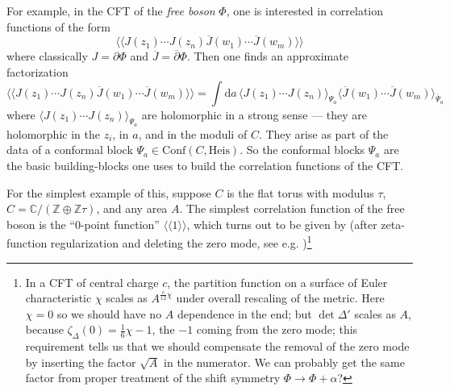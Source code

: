 \documentclass[12pt,letterpaper,reqno]{amsart}
\numberwithin{equation}{section}
\newcommand{\Heis}{{\mathrm{Heis}}}
\newcommand{\bbC}{\ensuremath{\mathbb C}}
\newcommand{\bbZ}{\ensuremath{\mathbb Z}}
\newcommand{\bJ}{\ensuremath{\overline J}}
\newcommand{\de}{\mathrm{d}}
\newcommand{\IP}[1]{\langle#1\rangle}
\newcommand{\DIP}[1]{\langle\!\langle#1\rangle\!\rangle}
\newcommand{\Conf}{\textrm{Conf}}
\newcommand{\ti}[1]{\textit{#1}}
\begin{document}
For example, in the CFT of the \ti{free boson} $\Phi$,
one is interested in correlation functions of the form
\begin{equation}
  \DIP{J(z_1) \cdots J(z_n) \bJ(w_1) \cdots \bJ(w_m)} 
\end{equation}
where classically $J = \partial \Phi$ and $\bJ = \overline\partial \Phi$.
Then one finds an approximate factorization
\begin{equation}
  \DIP{J(z_1) \cdots J(z_n) \bJ(w_1) \cdots \bJ(w_m)} = \int \de a \, \IP{J(z_1) \cdots J(z_n)}_{\Psi_a} \IP{\bJ(w_1) \cdots \bJ(w_m)}_{\overline\Psi_a}
\end{equation}
where $\IP{J(z_1) \cdots J(z_n)}_{\Psi_a}$ are holomorphic in a strong sense --- they
are holomorphic in the $z_i$, in $a$, and in the moduli of $C$.
They arise as part of the data of a conformal block $\Psi_a \in \Conf(C, \Heis)$.
So the conformal blocks $\Psi_a$ are the basic building-blocks one uses to build the 
correlation functions of the CFT.

For the simplest example of this, suppose $C$ is the flat torus with modulus 
$\tau$, $C = \bbC / (\bbZ \oplus \bbZ \tau)$, and any area $A$.
The simplest correlation function of the free boson is the ``$0$-point function'' $\DIP{1}$, which turns out to be given by
(after zeta-function regularization and deleting the zero mode,
see e.g. \cite{McIntyreTakhtajan2006})\footnote{In a CFT of central charge $c$, the partition function on a surface of Euler characteristic $\chi$ scales 
as $A^{\frac{c}{12} \chi}$ under overall rescaling of the metric. Here $\chi = 0$ so we should have no $A$ dependence in the end;
but $\det \Delta'$ 
scales as $A$, because $\zeta_\Delta(0) = \frac{1}{6} \chi - 1$,
the $-1$ coming from the zero mode;
this requirement tells us that we should compensate the removal
of the zero mode by inserting the factor $\sqrt{A}$ in the 
numerator. 
We can probably get the same factor from proper treatment of
the shift symmetry $\Phi \to \Phi + \alpha$? 
}




\end{document}
